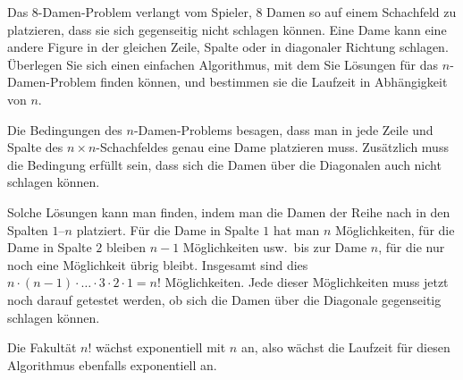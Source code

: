 Das 8-Damen-Problem verlangt vom Spieler, 8 Damen so auf einem Schachfeld
zu platzieren, dass sie sich gegenseitig nicht schlagen können.
Eine Dame kann eine andere Figure in der gleichen Zeile, Spalte oder
in diagonaler Richtung schlagen.
Überlegen Sie sich einen einfachen Algorithmus, mit dem Sie Lösungen
für das $n$-Damen-Problem finden können, und bestimmen sie die
Laufzeit in Abhängigkeit von $n$.

\begin{loesung}
Die Bedingungen des $n$-Damen-Problems besagen, dass man in jede Zeile
und Spalte des $n\times n$-Schachfeldes genau eine Dame platzieren muss.
Zusätzlich muss die Bedingung erfüllt sein, dass sich die Damen über die
Diagonalen auch nicht schlagen können.

Solche Lösungen kann man finden, indem man die Damen 
der Reihe nach in den Spalten $1$--$n$ platziert.
Für die Dame in Spalte $1$ hat man $n$ Möglichkeiten, für die Dame
in Spalte $2$ bleiben $n-1$ Möglichkeiten usw.~bis zur Dame $n$, für
die nur noch eine Möglichkeit übrig bleibt.
Insgesamt sind dies $n\cdot (n-1)\cdot\ldots\cdot 3\cdot 2\cdot 1=n!$
Möglichkeiten.
Jede dieser Möglichkeiten muss jetzt noch darauf getestet werden,
ob sich die Damen über die Diagonale gegenseitig schlagen können.

Die Fakultät $n!$ wächst exponentiell mit $n$ an, also wächst die
Laufzeit für diesen Algorithmus ebenfalls exponentiell an.
\end{loesung}
